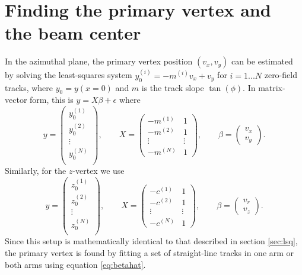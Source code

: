 \documentclass[12pt]{article}
\begin{document}
\section{Finding the primary vertex and the beam center}
In the azimuthal plane, the primary vertex position $(v_x, v_y)$ can be estimated by solving the least-squares system $y_0^{(i)} = -m^{(i)}v_x + v_y$ for $i=1...N$ zero-field tracks, where $y_0 = y(x=0)$ and $m$ is the track slope $\tan(\phi)$. In matrix-vector form, this is $y = X\beta + \epsilon$ where
\begin{equation} \label{eq:vxy}
y = 
 \begin{pmatrix}
 y_0^{(1)}\\
 y_0^{(2)}\\
 \vdots \\
 y_0^{(N)}\\
 \end{pmatrix},
 \qquad
X =
 \begin{pmatrix}
  -m^{(1)}  & 1\\
  -m^{(2)}  & 1\\
  \vdots  & \vdots \\
  -m^{(N)}  & 1
 \end{pmatrix},
 \qquad
\beta = 
 \begin{pmatrix}
 v_x\\
 v_y
 \end{pmatrix}.
\end{equation}
Similarly, for the $z$-vertex we use
\begin{equation} \label{eq:vrz}
y = 
 \begin{pmatrix}
 z_0^{(1)}\\
 z_0^{(2)}\\
 \vdots \\
 z_0^{(N)}\\
 \end{pmatrix},
 \qquad
X =
 \begin{pmatrix}
  -c^{(1)}  & 1\\
  -c^{(2)}  & 1\\
  \vdots  & \vdots \\
  -c^{(N)}  & 1
 \end{pmatrix},
 \qquad
\beta = 
 \begin{pmatrix}
 v_r\\
 v_z
 \end{pmatrix}.
\end{equation}
Since this setup is mathematically identical to that described in section \ref{sec:lsq}, the primary vertex is found by fitting a set of straight-line tracks in one arm or both arms using equation \ref{eq:betahat}.
\end{document}
